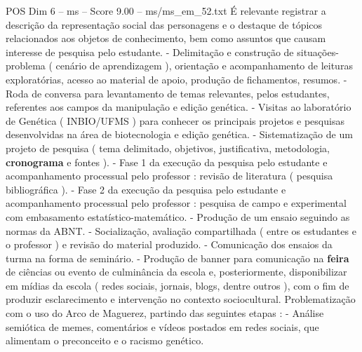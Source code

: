 \begin{textsample}{POS Dim 6 – ms – Score 9.00 – ms/ms\_em\_52.txt}
É relevante registrar a descrição da representação social das personagens e o destaque de tópicos relacionados aos objetos de conhecimento, bem como assuntos que causam interesse de pesquisa pelo estudante. - Delimitação e construção de situações-problema ( cenário de aprendizagem ), orientação e acompanhamento de leituras exploratórias, acesso ao material de apoio, produção de fichamentos, resumos. - Roda de conversa para levantamento de temas relevantes, pelos estudantes, referentes aos campos da manipulação e edição genética. - Visitas ao laboratório de Genética ( INBIO/UFMS ) para conhecer os principais projetos e pesquisas desenvolvidas na área de biotecnologia e edição genética. - Sistematização de um projeto de pesquisa ( tema delimitado, objetivos, justificativa, metodologia, \textbf{cronograma} e fontes ). - Fase 1 da execução da pesquisa pelo estudante e acompanhamento processual pelo professor : revisão de literatura ( pesquisa bibliográfica ). - Fase 2 da execução da pesquisa pelo estudante e acompanhamento processual pelo professor : pesquisa de campo e experimental com embasamento estatístico-matemático. - Produção de um ensaio seguindo as normas da ABNT. - Socialização, avaliação compartilhada ( entre os estudantes e o professor ) e revisão do material produzido. - Comunicação dos ensaios da turma na forma de seminário. - Produção de banner para comunicação na \textbf{feira} de ciências ou evento de culminância da escola e, posteriormente, disponibilizar em mídias da escola ( redes sociais, jornais, blogs, dentre outros ), com o fim de produzir esclarecimento e intervenção no contexto sociocultural.
Problematização com o uso do Arco de Maguerez, partindo das seguintes etapas : - Análise semiótica de memes, comentários e vídeos postados em redes sociais, que alimentam o preconceito e o racismo genético.

\end{textsample}
